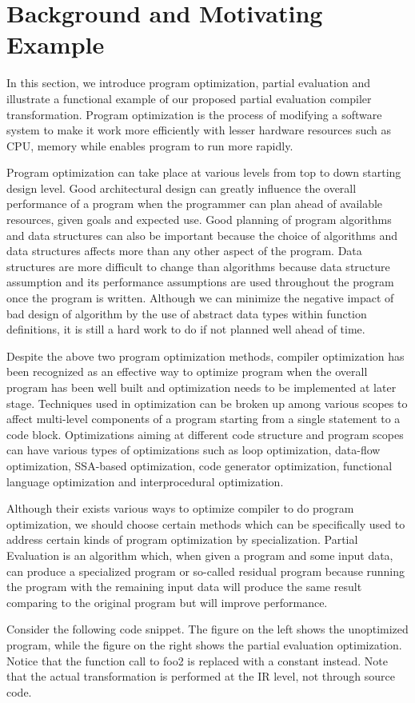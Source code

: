 \section{Background and Motivating Example}

In this section, we introduce program optimization, partial evaluation and illustrate a functional example of our proposed partial evaluation compiler transformation.
Program optimization is the process of modifying a software system to make it work more efficiently with lesser hardware resources such as CPU, memory while enables program to run more rapidly.

Program optimization can take place at various levels from top to down starting design level. Good architectural design can greatly influence the overall performance of a program when the programmer can plan ahead of available resources, given goals and expected use.
Good planning of program algorithms and data structures can also be important because the choice of algorithms and data structures affects more than any other aspect of the program. Data structures are more difficult to change than algorithms because data structure assumption and its performance assumptions are used throughout the program once the program is written. Although we can minimize the negative impact of bad design of algorithm by the use of abstract data types within function definitions, it is still a hard work to do if not planned well ahead of time. 

Despite the above two program optimization methods, compiler optimization has been recognized as an effective way to optimize program when the overall program has been well built and optimization needs to be implemented at later stage. Techniques used in optimization can be broken up among various scopes to affect multi-level components of a program starting from a single statement to a code block. Optimizations aiming at different code structure and program scopes can have various types of optimizations such as loop optimization, data-flow optimization, SSA-based optimization, code generator optimization, functional language optimization and interprocedural optimization. 

Although their exists various ways to optimize compiler to do program optimization, we should choose certain methods which can be specifically used to address certain kinds of program optimization by specialization. Partial Evaluation is an algorithm which, when given a program and some input data, can produce a specialized program or so-called residual program because running the program with the remaining input data will produce the same result comparing to the original program but will improve performance.

Consider the following code snippet.
The figure on the left shows the unoptimized program, while the figure on the right shows the partial evaluation optimization.
Notice that the function call to foo2 is replaced with a constant instead.
Note that the actual transformation is performed at the IR level, not through source code.
